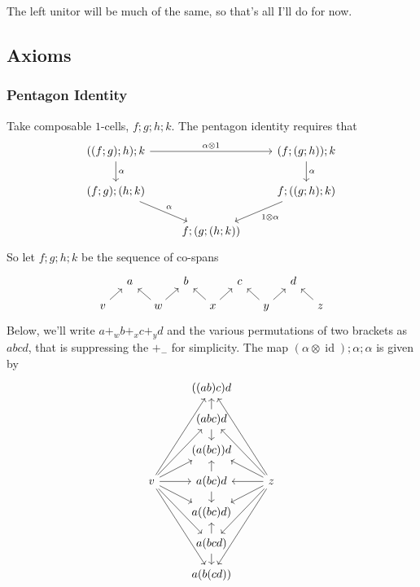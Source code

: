 \documentclass[12pt]{article}
\renewcommand{\(}{\left(}
\renewcommand{\)}{\right)}
\renewcommand{\{}{\left\lbrace}
\renewcommand{\}}{\right\rbrace}
\DeclareMathOperator{\id}{id}
\theoremstyle{remark}
\theoremstyle{definition}
\begin{document}
The left unitor will be much of the same, so that's all I'll do for now.  

\subsection*{Axioms}

\subsubsection*{Pentagon Identity}

Take composable $1$-cells, $f;g;h;k$. The pentagon identity requires that 
\[
	\begin{tikzcd}
		{((f;g);h);k} 
			\ar[d, "\alpha"] 
			\ar[rr, "\alpha \otimes 1"] &
		{} &
		{(f;(g;h));k} 
			\ar[d, "\alpha"] \\
		{(f;g);(h;k)} 
			\ar[dr, "\alpha"] &
		{} &
		{f;((g;h);k)} 
			\ar[dl, "1 \otimes \alpha"] \\
		{} &
		{f;(g;(h;k))} &
		{}
	\end{tikzcd}
\]
So let $f;g;h;k$ be the sequence of co-spans
\[
	\begin{tikzcd}[column sep=1em,row sep=1em]
		{} &
		{a} &
		{} &
		{b} &
		{} &
		{c} &
		{} &
		{d} &
		{} \\
		{v} 
			\ar[ru]&
		{} &
		{w} 
			\ar[lu]
			\ar[ru]&
		{} &
		{x} 
			\ar[lu]
			\ar[ru]&
		{} &
		{y} 
			\ar[lu]
			\ar[ru]&
		{} &
		{z} 
			\ar[lu]
	\end{tikzcd}
\]
Below, we'll write $a+_wb+_xc+_yd$ and the various permutations of two brackets as $abcd$, that is suppressing the $+_{-}$ for simplicity. The map $(\alpha \otimes \id);\alpha;\alpha$ is given by
\[
	\begin{tikzcd}[row sep=1em]
		{} &
		{((ab)c)d} &
		{} \\
		{} &
		{(abc)d} 
			\ar[u]
			\ar[d] &
		{} \\
		{} &
		{(a(bc))d} &
		{} \\
		{v} 
			\ar[ruuu] 
			\ar[ruu]
			\ar[ru]
			\ar[r]
			\ar[rd]
			\ar[rdd]
			\ar[rddd] &
		{a(bc)d} 
			\ar[u]
			\ar[d]&
		{z} 
			\ar[luuu] 
			\ar[luu]
			\ar[lu]
			\ar[l]
			\ar[ld]
			\ar[ldd]
			\ar[lddd]\\
		{} &
		{a((bc)d)} &
		{} \\
		{} &
		{a(bcd)} 
			\ar[u]
			\ar[d]&
		{} \\
		{} &
		{a(b(cd))} &
		{} 
	\end{tikzcd}
\]
\end{document}
